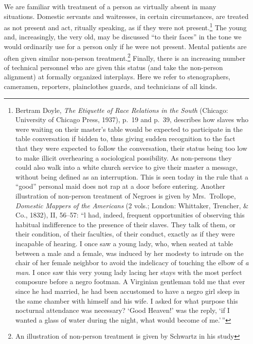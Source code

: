 \documentclass[openany,nobib]{tufte-book}
\begin{document}
\noindent We are familiar with treatment of a person as virtually absent in many
situations. Domestic servants and waitresses, in certain circumstances,
are treated as not present and act, ritually speaking, as if they were
not present.\footnote{Bertram Doyle, \emph{The Etiquette of Race
  Relations in the South} (Chicago: University of Chicago Press, 1937),
  p.~19 and p.~39, describes how slaves who were waiting on their
  master's table would be expected to participate in the table
  conversation if bidden to, thus giving sudden recognition to the fact
  that they were expected to follow the conversation, their status being
  too low to make illicit overhearing a sociological possibility. As
  non-persons they could also walk into a white church service to give
  their master a message, without being defined as an interruption. This
  is seen today in the rule that a ``good'' personal maid does not rap
  at a door before entering. Another illustration of non-person
  treatment of Negroes is given by Mrs.~Trollope, \emph{Domestic Mappers
  of the Americans} (2 vols.; London: Whittaker, Trencher, \& Co.,
  1832), II, 56--57: ``l had, indeed, frequent opportunities of
  observing this habitual indifference to the presence of their slaves.
  They talk of them, or their condition, of their faculties, of their
  conduct, exactly as if they were incapable of hearing. I once saw a
  young lady, who, when seated at table between a male and a female, was
  induced by her modesty to intrude on the chair of her female neighbor
  to avoid the indelicacy of touching the elbow of \emph{a man}. I once
  saw this very young lady lacing her stays with the most perfect
  composure before a negro footman. A Virginian gentleman told me that
  ever since he had married, he had been accustomed to have a negro girl
  sleep in the same chamber with himself and his wife. I asked for what
  purpose this nocturnal attendance was necessary? `Good Heaven!' was
  the reply, `if I wanted a glass of water during the night, what would
  become of me.'\,''} The young and, increasingly, the very old, may be
discussed ``to their faces'' in the tone we would ordinarily use for a
person only if he were not present. Mental patients are often given
similar non-person treatment.\footnote{An illustration of non-person
  treatment is given by Schwartz in his study} Finally, there is an
increasing number of technical personnel who are given this status (and
take the non-person alignment) at formally organized interplays. Here we
refer to stenographers, cameramen, reporters, plainclothes guards, and
technicians of all kinds.
\end{document}
